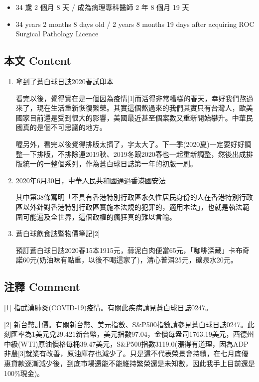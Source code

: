 \documentclass[a5paper, 11pt
]{book}
\providecommand{\tightlist}{%
  \setlength{\itemsep}{0pt}\setlength{\parskip}{0pt}}
\begin{document}
\begin{itemize}
\tightlist
\item
  34 歲 2 個月 8 天 / 成為病理專科醫師 2 年 8 個月 19 天
\item
  34 years 2 months 8 days old / 2 years 8 months 19 days after
  acquiring ROC Surgical Pathology Licence
\end{itemize}

\hypertarget{ux672cux6587-content-26}{%
\subsection{本文 Content}\label{ux672cux6587-content-26}}

\begin{enumerate}
\def\labelenumi{\arabic{enumi}.}
\item
  拿到了蒼白球日誌2020春試印本

  看完以後，覺得實在是一個因為疫情{[}1{]}而活得非常糟糕的春天，幸好我們熬過來了，現在生活重新恢復繁榮。其實這個熬過來的我們其實只有台灣人，歐美國家目前還是受到很大的影響，美國最近甚至個案數又重新開始攀升。中華民國真的是個不可思議的地方。

  喔另外，看完以後覺得排版太擠了，字太大了。下一季(2020夏)一定要好好調整一下排版，不排除連2019秋、2019冬跟2020春也一起重新調整，然後出成排版統一的一整個系列，作為蒼白球日誌第一年的初版一刷。
\item
  2020年6月30日，中華人民共和國通過香港國安法

  其中第38條寫明「不具有香港特別行政區永久性居民身份的人在香港特別行政區以外針對香港特別行政區實施本法規的犯罪的，適用本法」，也就是執法範圍可能遍及全世界，這個政權的瘋狂真的難以言喻。
\item
  蒼白球飲食誌暨物價筆記{[}2{]}

  預訂蒼白球日誌2020春15本1915元，蒜泥白肉便當65元，「咖啡深藏」卡布奇諾60元(奶油味有點重，以後不喝這家了)，清心普洱25元，礦泉水20元。
\end{enumerate}

\hypertarget{ux6ce8ux91cb-comment-26}{%
\subsection{注釋 Comment}\label{ux6ce8ux91cb-comment-26}}

{[}1{]} 指武漢肺炎(COVID-19)疫情。有關此疾病請見蒼白球日誌0247。

{[}2{]}
新台幣計價。有關新台幣、美元指數、S\&P500指數請參見蒼白球日誌0247。此刻匯率為1美元兌29.421新台幣，美元指數97.04，金價每盎司1763.19美元，西德州中級(WTI)原油價格每桶39.47美元，S\&P500指數3119.0(漲得有道理，因為ADP非農{[}3{]}就業有改善，原油庫存也減少了。只是這不代表榮景會持續，在七月底優惠貸款逐漸減少後，到底市場還能不能維持繁榮還是未知數，因此我手上目前還是100\%現金)。
\end{document}
